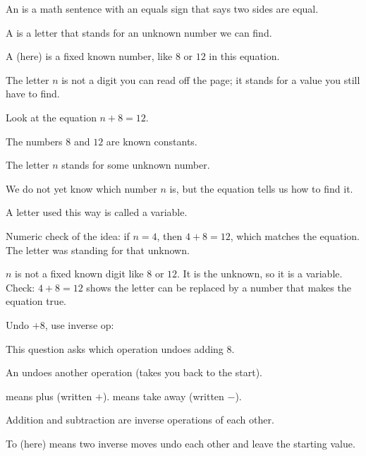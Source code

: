 \begin{words}
  \item An is a math sentence with an equals sign that says two sides
        are equal.
  \item A is a letter that stands for an unknown number we can find.
  \item A (here) is a fixed known number, like $8$ or $12$ in this
        equation.
  \item The letter $n$ is not a digit you can read off the page; it stands for a value
        you still have to find.
\end{words}

\begin{steps}
  \item Look at the equation $n + 8 = 12$.
  \item The numbers $8$ and $12$ are known constants.
  \item The letter $n$ stands for some unknown number.
  \item We do not yet know which number $n$ is, but the equation tells us how to find it.
  \item A letter used this way is called a variable.
  \item Numeric check of the idea: if $n = 4$, then $4 + 8 = 12$, which matches the
        equation. The letter was standing for that unknown.
\end{steps}


\noindent $n$ is not a fixed known digit like $8$ or $12$. It is the unknown, so
it is a variable. Check: $4 + 8 = 12$ shows the letter can be replaced by a
number that makes the equation true.


\noindent Undo $+8$, use inverse op: \blank[2.4cm]


\noindent This question asks which operation undoes adding $8$.

\begin{words}
  \item An undoes another operation (takes you back to the start).
  \item {}means plus (written $+$). means take away
        (written $-$).
  \item Addition and subtraction are inverse operations of each other.
  \item To (here) means two inverse moves undo each other and leave the
        starting value.
\end{words}

